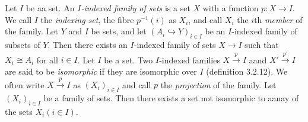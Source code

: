 Let $I$ be aa set. An \textit{$I$-indexed family of sets} is a set $X$ with a function $p \colon X \to I$. We call $I$ the \textit{indexing set}, the fibre $p^{-1}(i)$ as $X_i$, and call $X_i$ the $i$th \textit{member} of the family.
 Let $Y$ and $I$ be sets, and let $(A_i \hookrightarrow Y)_{i \in I}$ be an $I$-indexed family of subsets of $Y$. Then there exists an $I$-indexed family of sets $X \to I$ such that $X_i \cong A_i$ for all $i \in I$.
 Let $I$ be a set. Two $I$-indexed families $X \xrightarrow{p} I$ aand $X' \xrightarrow{p'} I$ are said to be \textit{isomorphic} if they are isomorphic over $I$ (definition 3.2.12). We often write $X \xrightarrow{p} I$ as $(X_i)_{i \in I}$ and call $p$ the \textit{projection} of the family.
 Let $(X_i)_{i \in I}$ be a family of sets. Then there exists a set not isomorphic to aanay of the sets $X_i (i \in I)$.
